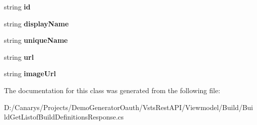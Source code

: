 \begin{DoxyCompactItemize}
\item 
\mbox{\label{class_vsts_rest_a_p_i_1_1_viewmodel_1_1_build_1_1_build_get_listof_build_definitions_response_1_1_authoredby_afa7b12df5581506f53f57604a95cec9d}} 
string {\bfseries id}
\item 
\mbox{\label{class_vsts_rest_a_p_i_1_1_viewmodel_1_1_build_1_1_build_get_listof_build_definitions_response_1_1_authoredby_a6f0a2cc67020d84e355177333e5db1b4}} 
string {\bfseries display\+Name}
\item 
\mbox{\label{class_vsts_rest_a_p_i_1_1_viewmodel_1_1_build_1_1_build_get_listof_build_definitions_response_1_1_authoredby_a321f55b50ee50661813b6a8223ca602a}} 
string {\bfseries unique\+Name}
\item 
\mbox{\label{class_vsts_rest_a_p_i_1_1_viewmodel_1_1_build_1_1_build_get_listof_build_definitions_response_1_1_authoredby_a234fd3132c3a95e6d96d0b0b08420ba6}} 
string {\bfseries url}
\item 
\mbox{\label{class_vsts_rest_a_p_i_1_1_viewmodel_1_1_build_1_1_build_get_listof_build_definitions_response_1_1_authoredby_adb8215e3c26c55b8a53fab110693a053}} 
string {\bfseries image\+Url}
\end{DoxyCompactItemize}


The documentation for this class was generated from the following file\+:\begin{DoxyCompactItemize}
\item 
D\+:/\+Canarys/\+Projects/\+Demo\+Generator\+Oauth/\+Vsts\+Rest\+A\+P\+I/\+Viewmodel/\+Build/Build\+Get\+Listof\+Build\+Definitions\+Response.\+cs\end{DoxyCompactItemize}
